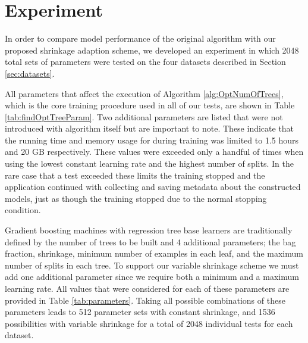 \documentclass[9pt, conference]{IEEEtran}
\begin{document}
\section {Experiment}
In order to compare model performance of the original algorithm with our proposed shrinkage adaption scheme, we developed an experiment in which 2048 total sets of parameters were tested on the four datasets described in Section \ref{sec:datasets}. 

All parameters that affect the execution of Algorithm \ref{alg:OptNumOfTrees}, which is the core training procedure used in all of our tests, are shown in Table \ref{tab:findOptTreeParam}. Two additional parameters are listed that were not introduced with algorithm itself but are important to note. These indicate that the running time and memory usage for during training was limited to 1.5 hours and 20 GB respectively. These values were exceeded only a handful of times when using the lowest constant learning rate and the highest number of splits. In the rare case that a test exceeded these limits the training stopped and the application continued with collecting and saving metadata about the constructed models, just as though the training stopped due to the normal stopping condition.

Gradient boosting machines with regression tree base learners are traditionally defined by the number of trees to be built and 4 additional parameters; the bag fraction, shrinkage, minimum number of examples in each leaf, and the maximum number of splits in each tree. To support our variable shrinkage scheme we must add one additional parameter since we require both a minimum and a maximum learning rate. All values that were considered for each of these parameters are provided in Table \ref{tab:parameters}. Taking all possible combinations of these parameters leads to 512 parameter sets with constant shrinkage, and 1536 possibilities with variable shrinkage for a total of 2048 individual tests for each dataset. 
\end{document}
